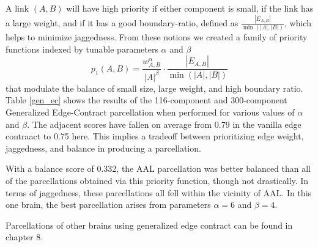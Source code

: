 A link $(A, B)$ will have high priority if either component is small,
if the link has a large weight, and if it has a good boundary-ratio,
defined as $\frac{|E_{A,B}|}{\min(|A|,|B|)}$, which helps to minimize
jaggedness. From these notions we created a family of priority
functions indexed by tunable parameters $\alpha$ and $\beta$
\[ p_1(A, B) = \frac{w_{A,B}^\alpha}{|A|^\beta} \cdot
               \frac{|E_{A,B}|}{\min(|A|,|B|)} \]
that modulate the balance of small size, large weight, and high
boundary ratio. Table \ref{gen_ec} shows the results of the
116-component and 300-component Generalized Edge-Contract parcellation
when performed for various values of $\alpha$ and $\beta$. The adjacent
scores have fallen on average from 0.79 in the vanilla edge contraact
to 0.75 here. This implies a tradeoff between prioritizing edge weight,
jaggedness, and balance in producing a parcellation.

With a balance score of 0.332, the AAL parcellation was better balanced
than all of the parcellations obtained via this priority function,
though not drastically. In terms of jaggedness, these parcellations
all fell within the vicinity of AAL. In this one brain, the best
parcellation arises from parameters $\alpha = 6$ and $\beta = 4$.

Parcellations of other brains using generalized edge contract can be
found in chapter 8.
